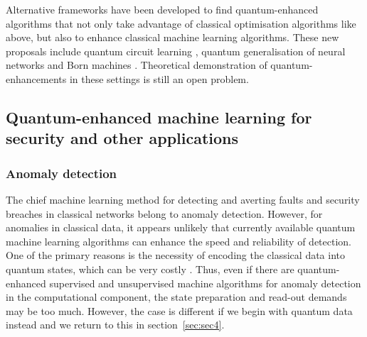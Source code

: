 \documentclass[twocolumn, aps, rmp, amsmath, amssymb, nofootinbib, superscriptaddress, longbibliography, floatfix, table-of-contents, eqsecnum]{revtex4-2}
\begin{document}
Alternative frameworks have been developed to find quantum-enhanced algorithms that not only take advantage of classical optimisation algorithms like above, but also to enhance classical machine learning algorithms. These new proposals include quantum circuit learning \cite{mitarai2018quantum}, quantum generalisation of neural networks \cite{wan2017quantum} and Born machines \cite{cheng2018information, benedetti2018generative}. Theoretical demonstration of quantum-enhancements in these settings is still an open problem.




\subsection{Quantum-enhanced machine learning for security and other applications}

\subsubsection{Anomaly detection}

The chief machine learning method for detecting and averting faults and security breaches in classical networks belong to anomaly detection. However, for anomalies in classical data, it appears unlikely that currently available quantum machine learning algorithms can enhance the speed and reliability of detection. One of the primary reasons is the necessity of encoding the classical data into quantum states, which can be very costly \cite{aaronson2015read}. Thus, even if there are quantum-enhanced supervised and unsupervised machine algorithms for anomaly detection in the computational component, the state preparation and read-out demands may be too much. However, the case is different if we begin with quantum data instead and we return to this in section~\ref{sec:sec4}.
\end{document}

